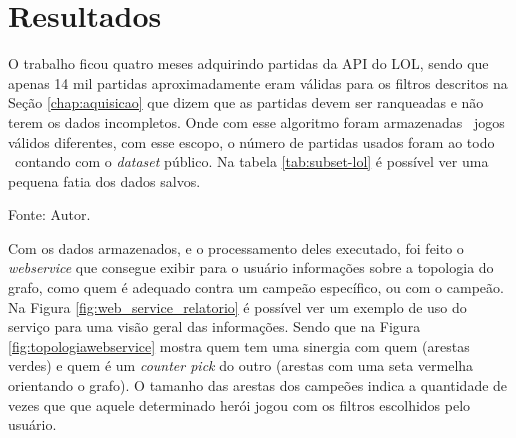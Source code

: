 \chapter{Resultados}

O trabalho ficou quatro meses adquirindo partidas da API do LOL, sendo que apenas 14 mil partidas aproximadamente eram válidas para os filtros descritos na Seção \ref{chap:aquisicao} que dizem que as partidas devem ser ranqueadas e não terem os dados incompletos.
Onde com esse algoritmo foram armazenadas \numpartidas\ jogos válidos diferentes, com esse escopo, o número de partidas usados foram ao todo \partidasrankeds\ contando com o \textit{dataset} público.
Na tabela \ref{tab:subset-lol} é possível ver uma pequena fatia dos dados salvos.


\begin{table}[H]
	\centering
	\caption{Exemplo de \textit{subset} salvo no banco de dados}
	\label{tab:subset-lol}
	\small{Fonte: Autor.}
\end{table}

Com os dados armazenados, e o processamento deles executado, foi feito o \textit{webservice} que consegue exibir para o usuário informações sobre a topologia do grafo, como quem é adequado contra um campeão específico, ou com o campeão.
Na Figura \ref{fig:web_service_relatorio} é possível ver um exemplo de uso do serviço para uma visão geral das informações. Sendo que na Figura \ref{fig:topologiawebservice} mostra quem tem uma sinergia com quem (arestas verdes) e quem é um \textit{counter pick} do outro (arestas com uma seta vermelha orientando o grafo). O tamanho das arestas dos campeões indica a quantidade de vezes que que aquele determinado herói jogou com os filtros escolhidos pelo usuário.



